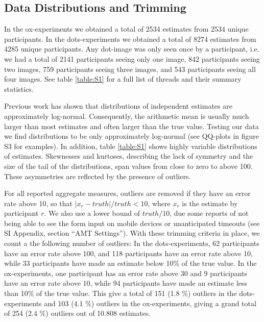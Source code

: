 \documentclass[9pt,twoside,lineno]{pnas-new}
\begin{document}
\subsection*{Data Distributions and Trimming}
In the ox-experiments we obtained a total of 2534 estimates from 2534 unique participants. In the dots-experiments we obtained a total of 8274 estimates from 4285 unique participants. Any dot-image was only seen once by a participant, i.e. we had a total of 2141 participants seeing only one image, 842 participants seeing two images, 759 participants seeing three images, and 543 participants seeing all four images. See table \ref{table:S1} for a full list of threads and their summary statistics. 

Previous work has shown that distributions of independent estimates are approximately log-normal. Consequently, the arithmetic mean is usually much larger than most estimates and often larger than the true value. Testing our data we find distributions to be only approximately log-normal (see QQ-plots in figure S3 for examples). In addition, table \ref{table:S1} shows highly variable distributions of estimates. Skewnesses and kurtoses, describing the lack of symmetry and the size of the tail of the distributions, span values from close to zero to above 100. These asymmetries are reflected by the presence of outliers. 

For all reported aggregate measures, outliers are removed if they have an error rate above 10, so that $|x_r-truth|/truth <10$, where $x_r$ is the estimate by participant $r$. We also use a lower bound of $truth/10$, due some reports of not being able to see the form input on mobile devices or unanticipated timeouts (see SI Appendix, section “AMT Settings”). With these trimming criteria in place, we count a the following number of outliers: In the dots-experiments, 62 participants have an error rate above 100, and 118 participants have an error rate above 10, while 33 participants have made an estimate below 10\% of the true value. In the ox-experiments, one participant has an error rate above 30 and 9 participants have an error rate above 10, while 94 participants have made an estimate less than 10\% of the true value. This give a total of 151 (1.8 \%) outliers in the dots-experiments and 103 (4.1 \%) outliers in the ox-experiments, giving a grand total of 254 (2.4 \%) outliers out of 10.808 estimates.
\end{document}
